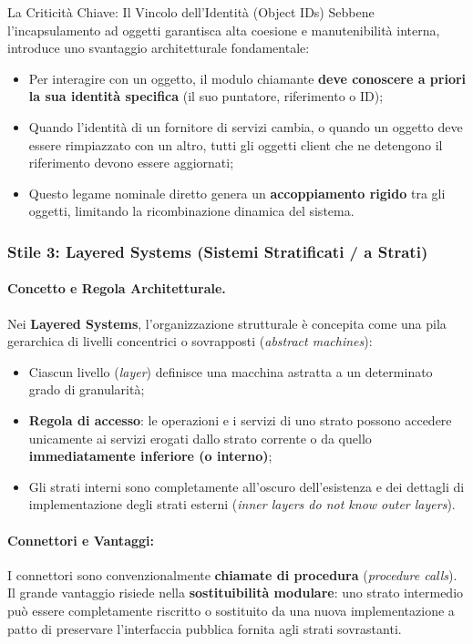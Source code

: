 \documentclass[12pt]{extarticle}
\begin{document}
\begin{cbox}{La Criticità Chiave: Il Vincolo dell'Identità (Object IDs)}
\noindent Sebbene l'incapsulamento ad oggetti garantisca alta coesione e manutenibilità interna, introduce uno svantaggio architetturale fondamentale:
\begin{itemize}
    \item Per interagire con un oggetto, il modulo chiamante \textbf{deve conoscere a priori la sua identità specifica} (il suo puntatore, riferimento o ID);
    \item Quando l'identità di un fornitore di servizi cambia, o quando un oggetto deve essere rimpiazzato con un altro, tutti gli oggetti client che ne detengono il riferimento devono essere aggiornati;
    \item Questo legame nominale diretto genera un \textbf{accoppiamento rigido} tra gli oggetti, limitando la ricombinazione dinamica del sistema.
\end{itemize}
\end{cbox}

\subsubsection{Stile 3: Layered Systems (Sistemi Stratificati / a Strati)}

\paragraph{Concetto e Regola Architetturale.}
Nei \textbf{Layered Systems}, l'organizzazione strutturale è concepita come una pila gerarchica di livelli concentrici o sovrapposti (\textit{abstract machines}):
\begin{itemize}
    \item Ciascun livello (\textit{layer}) definisce una macchina astratta a un determinato grado di granularità;
    \item \textbf{Regola di accesso}: le operazioni e i servizi di uno strato possono accedere unicamente ai servizi erogati dallo strato corrente o da quello \textbf{immediatamente inferiore (o interno)};
    \item Gli strati interni sono completamente all'oscuro dell'esistenza e dei dettagli di implementazione degli strati esterni (\textit{inner layers do not know outer layers}).
\end{itemize}

\paragraph{Connettori e Vantaggi:}
I connettori sono convenzionalmente \textbf{chiamate di procedura} (\textit{procedure calls}). Il grande vantaggio risiede nella \textbf{sostituibilità modulare}: uno strato intermedio può essere completamente riscritto o sostituito da una nuova implementazione a patto di preservare l'interfaccia pubblica fornita agli strati sovrastanti.
\end{document}
